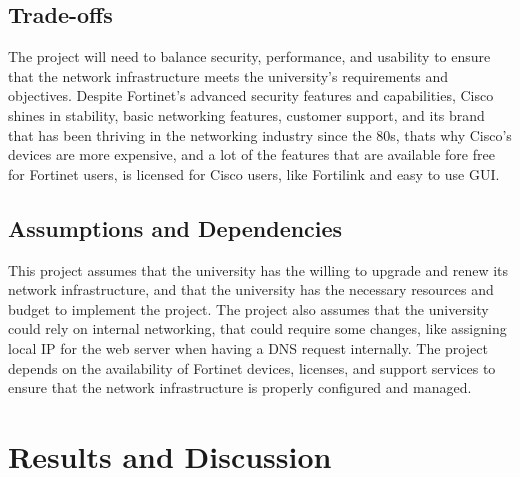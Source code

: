 \documentclass[12pt]{report}
\begin{document}
\section{Trade-offs}
The project will need to balance security, performance, and usability to ensure that the network infrastructure meets the university's requirements and objectives. Despite Fortinet's advanced security features and capabilities, Cisco shines in stability, basic networking features, customer support, and its brand that has been thriving in the networking industry since the 80s, thats why Cisco's devices are more expensive, and a lot of the features that are available fore free for Fortinet users, is licensed for Cisco users, like Fortilink and easy to use GUI. 

\section{Assumptions and Dependencies}
This project assumes that the university has the willing to upgrade and renew its network infrastructure, and that the university has the necessary resources and budget to implement the project. The project also assumes that the university could rely on internal networking, that could require some changes, like assigning local IP for the web server when having a DNS request internally. The project depends on the availability of Fortinet devices, licenses, and support services to ensure that the network infrastructure is properly configured and managed. 


\chapter{Results and Discussion}
\end{document}
